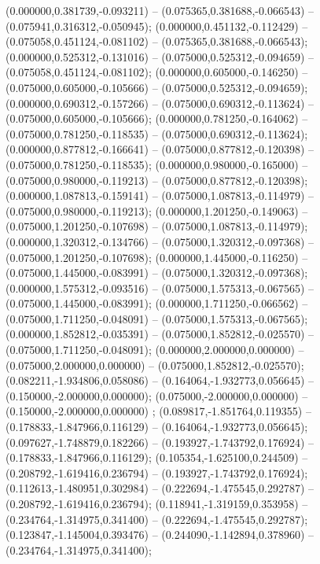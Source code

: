  (0.000000,0.381739,-0.093211) -- (0.075365,0.381688,-0.066543) -- (0.075941,0.316312,-0.050945);
 (0.000000,0.451132,-0.112429) -- (0.075058,0.451124,-0.081102) -- (0.075365,0.381688,-0.066543);
 (0.000000,0.525312,-0.131016) -- (0.075000,0.525312,-0.094659) -- (0.075058,0.451124,-0.081102);
 (0.000000,0.605000,-0.146250) -- (0.075000,0.605000,-0.105666) -- (0.075000,0.525312,-0.094659);
 (0.000000,0.690312,-0.157266) -- (0.075000,0.690312,-0.113624) -- (0.075000,0.605000,-0.105666);
 (0.000000,0.781250,-0.164062) -- (0.075000,0.781250,-0.118535) -- (0.075000,0.690312,-0.113624);
 (0.000000,0.877812,-0.166641) -- (0.075000,0.877812,-0.120398) -- (0.075000,0.781250,-0.118535);
 (0.000000,0.980000,-0.165000) -- (0.075000,0.980000,-0.119213) -- (0.075000,0.877812,-0.120398);
 (0.000000,1.087813,-0.159141) -- (0.075000,1.087813,-0.114979) -- (0.075000,0.980000,-0.119213);
 (0.000000,1.201250,-0.149063) -- (0.075000,1.201250,-0.107698) -- (0.075000,1.087813,-0.114979);
 (0.000000,1.320312,-0.134766) -- (0.075000,1.320312,-0.097368) -- (0.075000,1.201250,-0.107698);
 (0.000000,1.445000,-0.116250) -- (0.075000,1.445000,-0.083991) -- (0.075000,1.320312,-0.097368);
 (0.000000,1.575312,-0.093516) -- (0.075000,1.575313,-0.067565) -- (0.075000,1.445000,-0.083991);
 (0.000000,1.711250,-0.066562) -- (0.075000,1.711250,-0.048091) -- (0.075000,1.575313,-0.067565);
 (0.000000,1.852812,-0.035391) -- (0.075000,1.852812,-0.025570) -- (0.075000,1.711250,-0.048091);
 (0.000000,2.000000,0.000000) -- (0.075000,2.000000,0.000000) -- (0.075000,1.852812,-0.025570);
 (0.082211,-1.934806,0.058086) -- (0.164064,-1.932773,0.056645) -- (0.150000,-2.000000,0.000000);
 (0.075000,-2.000000,0.000000) -- (0.150000,-2.000000,0.000000) ;
 (0.089817,-1.851764,0.119355) -- (0.178833,-1.847966,0.116129) -- (0.164064,-1.932773,0.056645);
 (0.097627,-1.748879,0.182266) -- (0.193927,-1.743792,0.176924) -- (0.178833,-1.847966,0.116129);
 (0.105354,-1.625100,0.244509) -- (0.208792,-1.619416,0.236794) -- (0.193927,-1.743792,0.176924);
 (0.112613,-1.480951,0.302984) -- (0.222694,-1.475545,0.292787) -- (0.208792,-1.619416,0.236794);
 (0.118941,-1.319159,0.353958) -- (0.234764,-1.314975,0.341400) -- (0.222694,-1.475545,0.292787);
 (0.123847,-1.145004,0.393476) -- (0.244090,-1.142894,0.378960) -- (0.234764,-1.314975,0.341400);
